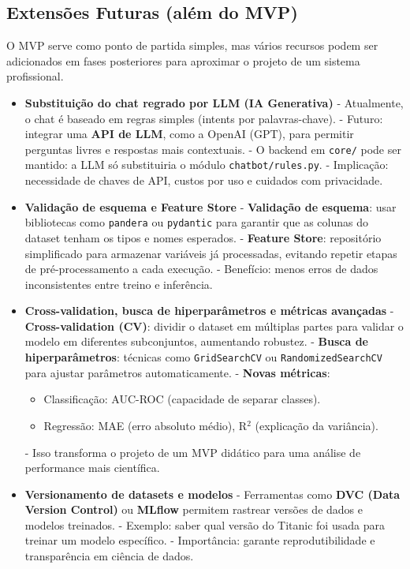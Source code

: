 \documentclass[12pt,a4paper]{article}
\begin{document}
\subsection{Extensões Futuras (além do MVP)}

O MVP serve como ponto de partida simples, mas vários recursos podem ser adicionados em fases posteriores para aproximar o projeto de um sistema profissional.  

\begin{itemize}
  \item \textbf{Substituição do chat regrado por LLM (IA Generativa)}  
  - Atualmente, o chat é baseado em regras simples (intents por palavras-chave).  
  - Futuro: integrar uma \textbf{API de LLM}, como a OpenAI (GPT), para permitir perguntas livres e respostas mais contextuais.  
  - O backend em \texttt{core/} pode ser mantido: a LLM só substituiria o módulo \texttt{chatbot/rules.py}.  
  - Implicação: necessidade de chaves de API, custos por uso e cuidados com privacidade.  

  \item \textbf{Validação de esquema e Feature Store}  
  - \textbf{Validação de esquema}: usar bibliotecas como \texttt{pandera} ou \texttt{pydantic} para garantir que as colunas do dataset tenham os tipos e nomes esperados.  
  - \textbf{Feature Store}: repositório simplificado para armazenar variáveis já processadas, evitando repetir etapas de pré-processamento a cada execução.  
  - Benefício: menos erros de dados inconsistentes entre treino e inferência.  

  \item \textbf{Cross-validation, busca de hiperparâmetros e métricas avançadas}  
  - \textbf{Cross-validation (CV)}: dividir o dataset em múltiplas partes para validar o modelo em diferentes subconjuntos, aumentando robustez.  
  - \textbf{Busca de hiperparâmetros}: técnicas como \texttt{GridSearchCV} ou \texttt{RandomizedSearchCV} para ajustar parâmetros automaticamente.  
  - \textbf{Novas métricas}:  
    \begin{itemize}
      \item Classificação: AUC-ROC (capacidade de separar classes).  
      \item Regressão: MAE (erro absoluto médio), R$^2$ (explicação da variância).  
    \end{itemize}
  - Isso transforma o projeto de um MVP didático para uma análise de performance mais científica.  

  \item \textbf{Versionamento de datasets e modelos}  
  - Ferramentas como \textbf{DVC (Data Version Control)} ou \textbf{MLflow} permitem rastrear versões de dados e modelos treinados.  
  - Exemplo: saber qual versão do Titanic foi usada para treinar um modelo específico.  
  - Importância: garante reprodutibilidade e transparência em ciência de dados.  


\end{itemize}
\end{document}
